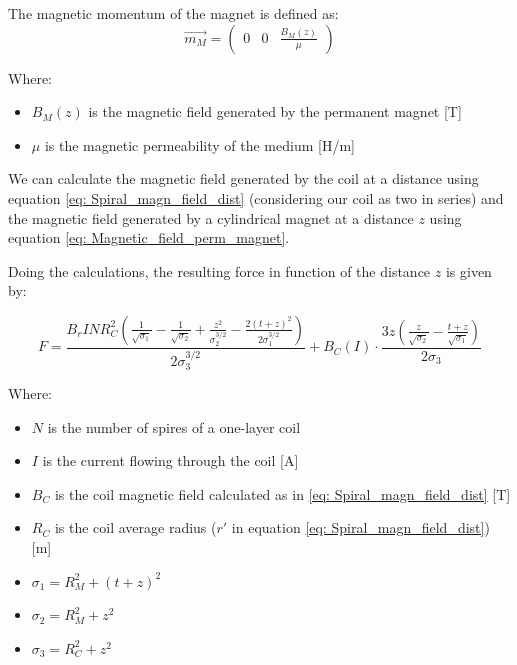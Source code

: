 \begin{samepage}
    The magnetic momentum of the magnet is defined as:
    \begin{equation*}
        \overrightarrow{m_M} = 
        \begin{pmatrix}
            0 & 0 & \frac{B_M(z)}{\mu}
        \end{pmatrix}
    \end{equation*}
    \nopagebreak

    Where:
    \begin{itemize}
        \item $B_M(z)$ is the magnetic field generated by the permanent magnet [T]
        \item $\mu$ is the magnetic permeability of the medium [H/m]
    \end{itemize}
\end{samepage}

We can calculate the magnetic field generated by the coil at a distance using equation \ref{eq: Spiral_magn_field_dist} (considering our coil as two in series) and the magnetic field generated by a cylindrical magnet at a distance $z$ using equation \ref{eq: Magnetic_field_perm_magnet}.

\begin{samepage}
    Doing the calculations, the resulting force in function of the distance $z$ is given by:
    \nopagebreak

    \begin{equation*}
        F = \frac{ B_r I N R_C^2 \left(\frac{1}{\sqrt{\sigma_1}} - \frac{1}{\sqrt{\sigma_2}} + \frac{z^2}{\sigma_2^{3/2}} - \frac{2(t+z)^2}{2\sigma_1^{3/2}}\right)}{2\sigma_3^{3/2}} + B_C(I) \cdot \frac{3z \left(\frac{z}{\sqrt{\sigma_2}} - \frac{t+z}{\sqrt{\sigma_1}}\right)}{2\sigma_3}
    \end{equation*}
    \nopagebreak

    Where:
    \nopagebreak

    \begin{itemize}
        \item $N$ is the number of spires of a one-layer coil
        \item $I$ is the current flowing through the coil [A]
        \item $B_C$ is the coil magnetic field calculated as in \ref{eq: Spiral_magn_field_dist} [T]
        \item $R_C$ is the coil average radius ($r'$ in equation \ref{eq: Spiral_magn_field_dist}) [m]
        \item $\sigma_1 = R_M^2 + (t+z)^2$
        \item $\sigma_2 = R_M^2 + z^2$
        \item $\sigma_3 = R_C^2 + z^2$    
    \end{itemize}
\end{samepage}

